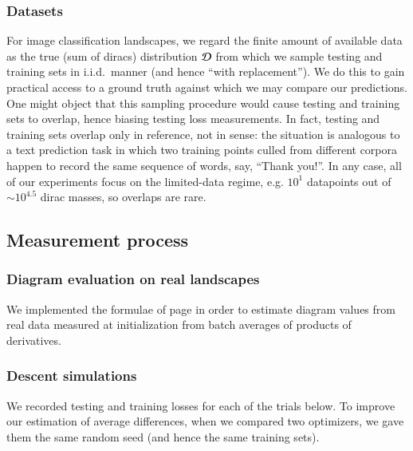             \subsubsection{Datasets}
                For image classification landscapes, we regard the finite amount of
                available data as the true (sum of diracs) distribution $\mathcal{D}$ from
                which we sample testing and training sets in i.i.d.\ manner (and hence
                ``with replacement'').  We do this to gain practical access to a
                ground truth against which we may compare our predictions.  One
                might object that this sampling procedure would cause testing and
                training sets to overlap, hence biasing testing loss measurements.  In
                fact, testing and training sets overlap only in reference, not in
                sense: the situation is analogous to a text prediction task in
                which two training points culled from different corpora happen to
                record the same sequence of words, say, ``Thank you!''.  In any
                case, all of our experiments focus on the limited-data regime, e.g.
                $10^1$ datapoints out of $\sim 10^{4.5}$ dirac masses, so overlaps
                are rare.

        \subsection{Measurement process}                                \label{appendix:measure}

            \subsubsection{Diagram evaluation on real landscapes}
                We implemented the formulae of page \pageref{appendix:bessel} in order
                to estimate diagram values from real data measured at
                initialization from batch averages of products of derivatives.

            \subsubsection{Descent simulations}
                We recorded testing and training losses for each of the trials below.  To
                improve our estimation of average differences, when we compared two
                optimizers, we gave them the same random seed (and hence the same
                training sets).

